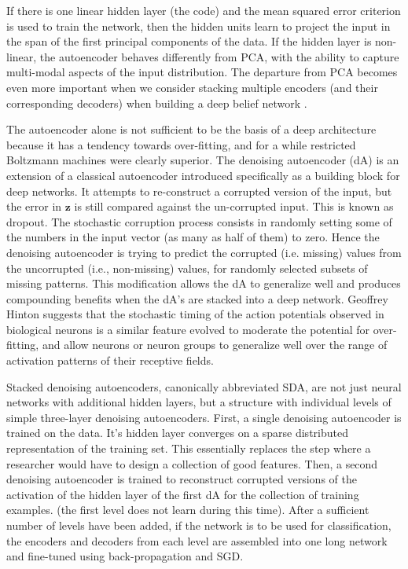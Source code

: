 \documentclass[12pt]{article}
\begin{document}
\begin{doublespacing}
If there is one linear hidden layer (the code) and the mean squared error criterion is used to train the network, then the  hidden units learn to project the input in the span of the first  principal components of the data. If the hidden layer is non-linear, the autoencoder behaves differently from PCA, with the ability to capture multi-modal aspects of the input distribution. The departure from PCA becomes even more important when we consider stacking multiple encoders (and their corresponding decoders) when building a deep belief network \cite{hinton2006reducing}.

The autoencoder alone is not sufficient to be the basis of a deep architecture because it has a tendency towards over-fitting, and for a while restricted Boltzmann machines were clearly superior. 
The denoising autoencoder (dA) is an extension of a classical autoencoder introduced specifically as a building block for deep networks\cite{vincent2008extracting}.  It attempts to re-construct a corrupted version of the input, but the error in $\mathbf z$ is still compared against the un-corrupted input. This is known as dropout. The stochastic corruption process consists in randomly setting some of the numbers in the input vector (as many as half of them) to zero. Hence the denoising autoencoder is trying to predict the corrupted (i.e. missing) values from the uncorrupted (i.e., non-missing) values, for randomly selected subsets of missing patterns. This modification allows the dA to generalize well and produces compounding benefits when the dA's are stacked into a deep network\cite{hinton2006reducing}. Geoffrey Hinton suggests that the stochastic timing of the action potentials observed in biological neurons is a similar feature evolved to moderate the potential for over-fitting, and allow neurons or neuron groups to generalize well over the range of activation patterns of their receptive fields.
	
Stacked denoising autoencoders, canonically abbreviated SDA, are not just neural networks with additional hidden layers, but a structure with individual levels of simple three-layer denoising autoencoders. First, a single denoising autoencoder is trained on the data. It's hidden layer converges on a sparse distributed representation of the training set. This essentially replaces the step where a researcher would have to design a collection of good features. Then, a second denoising autoencoder is trained to reconstruct corrupted versions of the activation of the hidden layer of the first dA for the collection of training examples. (the first level does not learn during this time). After a sufficient number of levels have been added, if the network is to be used for classification, the encoders and decoders from each level are assembled into one long network and fine-tuned using back-propagation and SGD.


\end{doublespacing}
\end{document}
